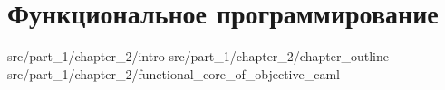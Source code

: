 \chapter{Функциональное программирование}

 {src/part_1/chapter_2/intro}
 {src/part_1/chapter_2/chapter_outline}
 {src/part_1/chapter_2/functional_core_of_objective_caml}